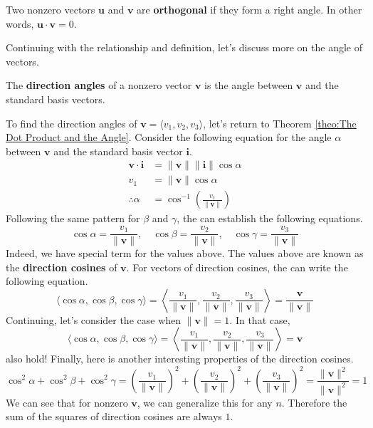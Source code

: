 \documentclass[../../../main.tex]{subfiles}
\begin{document}
\begin{definition}{}{}
Two nonzero vectors $\mathbf{u}$ and $\mathbf{v}$ are
\textbf{orthogonal} if they form a right angle. In other words,
$\mathbf{u} \cdot \mathbf{v} = 0$.
\end{definition}

Continuing with the relationship and definition, let's discuss
more on the angle of vectors.

\begin{definition}{}{}
The \textbf{direction angles} of a nonzero vector $\mathbf{v}$ is
the angle between $\mathbf{v}$ and the standard basis vectors.
\end{definition}

To find the direction angles of $\mathbf{v} = \langle v_1, v_2, v_3
\rangle$, let's return to Theorem \ref{theo:The Dot Product and the
Angle}. Consider the following equation for the angle $\alpha$
between $\mathbf{v}$ and the standard basis vector $\mathbf{i}$.
\begin{align*}
    \mathbf{v} \cdot \mathbf{i}
    &= \| \mathbf{v} \| \| \mathbf{i} \| \cos\alpha \\
    v_1 &= \| \mathbf{v} \| \cos\alpha \\
    \therefore
    \alpha &= \cos^{-1} \left( \frac{v_1}{\| \mathbf{v} \|} \right)
\end{align*}
Following the same pattern for $\beta$ and $\gamma$, the can
establish the following equations.
\[
\cos\alpha = \frac{v_1}{\| \mathbf{v} \|}, \quad
\cos\beta = \frac{v_2}{\| \mathbf{v} \|}, \quad
\cos\gamma = \frac{v_3}{\| \mathbf{v} \|}
\]
Indeed, we have special term for the values above. The values above
are known as the \textbf{direction cosines} of $\mathbf{v}$. For
vectors of direction cosines, the can write the following equation.
\[
\langle \cos\alpha, \cos\beta, \cos\gamma \rangle
= \left\langle
    \frac{v_1}{\| \mathbf{v} \|},
    \frac{v_2}{\| \mathbf{v} \|},
    \frac{v_3}{\| \mathbf{v} \|}
\right\rangle
= \frac{\mathbf{v}}{\| \mathbf{v} \|}
\]
Continuing, let's consider the case when $\| \mathbf{v} \| = 1$.
In that case,
\[
\langle \cos\alpha, \cos\beta, \cos\gamma \rangle
= \left\langle
    \frac{v_1}{\| \mathbf{v} \|},
    \frac{v_2}{\| \mathbf{v} \|},
    \frac{v_3}{\| \mathbf{v} \|}
\right\rangle
= \mathbf{v}
\]
also hold! Finally, here is another interesting properties of the
direction cosines.
\[
\cos^2\alpha + \cos^2\beta + \cos^2\gamma
= \left( \frac{v_1}{\| \mathbf{v} \|} \right)^2
    + \left( \frac{v_2}{\| \mathbf{v} \|} \right)^2
    + \left( \frac{v_3}{\| \mathbf{v} \|} \right)^2
= \frac{\| \mathbf{v} \|^2}{\| \mathbf{v} \|^2}
= 1
\]
We can see that for nonzero $\mathbf{v}$, we can generalize this
for any $n$. Therefore the sum of the squares of direction cosines
are always $1$.
\end{document}
